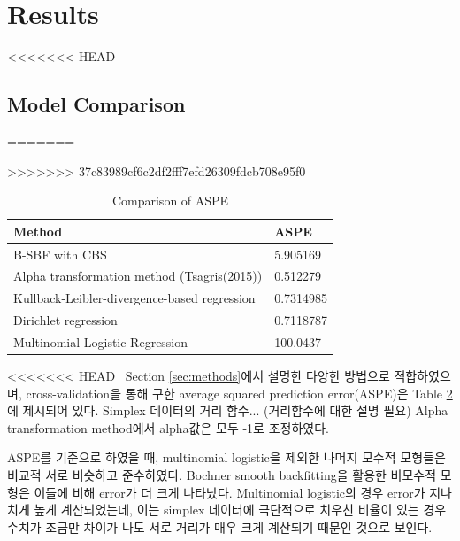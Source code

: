 \section{Results}\label{sec:results}


<<<<<<< HEAD
\subsection{Model Comparison}\label{sec:comparison}

\begin{table}[t]
	\centering
=======


\begin{table}
>>>>>>> 37c83989cf6c2df2fff7efd26309fdcb708e95f0
\begin{tabular}{ | p{9cm} | m{1.5cm} | } 
\hline
Method & ASPE \\
\hline
B-SBF with CBS & 5.905169 \\ 
\hline
Alpha transformation method (Tsagris(2015)) & 0.512279 \\ 
\hline
Kullback-Leibler-divergence-based regression & 0.7314985 \\
\hline
Dirichlet regression & 0.7118787 \\
\hline
Multinomial Logistic Regression & 100.0437 \\
\hline
\end{tabular}
 \caption{Comparison of ASPE}
 \label{table:1}
\end{table}

<<<<<<< HEAD
\ \quad Section \ref{sec:methods}에서 설명한 다양한 방법으로 적합하였으며, cross-validation을 통해 구한 average squared prediction error(ASPE)은 Table \ref{table:1}에 제시되어 있다. Simplex 데이터의 거리 함수... (거리함수에 대한 설명 필요) Alpha transformation method에서 alpha값은 모두 -1로 조정하였다.

ASPE를 기준으로 하였을 때, multinomial logistic을 제외한 나머지 모수적 모형들은 비교적 서로 비슷하고 준수하였다. Bochner smooth backfitting을 활용한 비모수적 모형은 이들에 비해 error가 더 크게 나타났다. Multinomial logistic의 경우 error가 지나치게 높게 계산되었는데, 이는 simplex 데이터에 극단적으로 치우친 비율이 있는 경우 수치가 조금만 차이가 나도 서로 거리가 매우 크게 계산되기 때문인 것으로 보인다.


\end{table}
